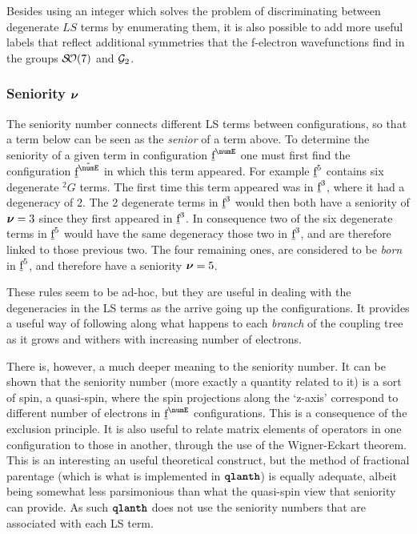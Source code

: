 \documentclass{article}
\begin{document}
Besides using an integer which solves the problem of discriminating between degenerate $LS$ terms by enumerating them, it is also possible to add more useful labels that reflect additional symmetries that the f-electron wavefunctions find in the groups $\mathcal{S\!O}(7)$ and $\mathcal{G}_2$.

\subsubsection{Seniority $\boldsymbol{\nu}$}

The seniority number connects different LS terms between configurations, so that a term below can be seen as the \textit{senior} of a term above. To determine the seniority of a given term in configuration $\forb^\numE$ one must first find the configuration $\forb^{\tilde{\numE}}$ in which this term appeared. For example $\underbar{$\text{f}$}^{5}$ contains six degenerate ${}^2G$ terms. The first time this term appeared was in $\underbar{$\text{f}$}^3$, where it had a degeneracy of 2. The 2 degenerate terms in $\underbar{$\text{f}$}^3$ would then both have a seniority of $\boldsymbol{\nu}=3$ since they first appeared in $\underbar{$\text{f}$}^3$. In consequence two of the six degenerate terms in $\underbar{$\text{f}$}^5$ would have the same degeneracy those two in $\underbar{$\text{f}$}^3$, and are therefore linked to those previous two. The four remaining ones, are  considered to be \textit{born} in $\underbar{$\text{f}$}^5$, and therefore have a seniority $\boldsymbol{\nu}=5$.

These rules seem to be ad-hoc, but they are useful in dealing with the degeneracies in the LS terms as the arrive going up the configurations. It provides a useful way of following along what happens to each \textit{branch} of the coupling tree as it grows and withers with increasing number of electrons.

There is, however, a much deeper meaning to the seniority number. It can be shown that the seniority number (more exactly a quantity related to it) is a sort of spin, a quasi-spin, where the spin projections along the `z-axis' correspond to different number of electrons in $\forb^\numE$ configurations. This is a consequence of the exclusion principle. It is also useful to relate matrix elements of operators in one configuration to those in another, through the use of the Wigner-Eckart theorem. This is an interesting an useful theoretical construct, but the method of fractional parentage (which is what is implemented in $\textbf{\texttt{qlanth}}$) is equally adequate, albeit being somewhat less parsimonious than what the quasi-spin view that seniority can provide. As such $\textbf{\texttt{qlanth}}$ does not use the seniority numbers that are associated with each LS term.
\end{document}
